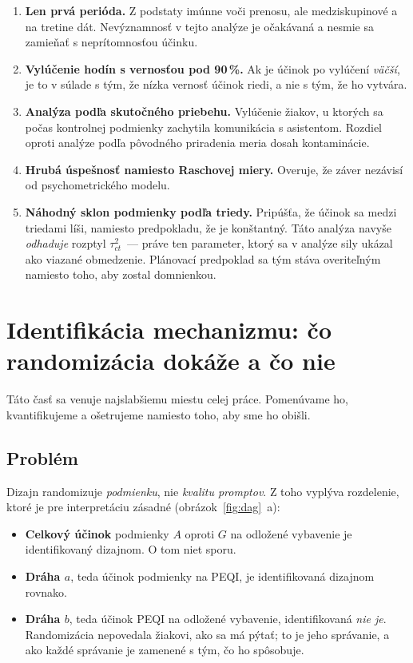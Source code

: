 \begin{enumerate}[nosep]
    \item \textbf{Len prvá perióda.} Z podstaty imúnne voči prenosu, ale medziskupinové a na tretine dát. Nevýznamnosť v tejto analýze je očakávaná a nesmie sa zamieňať s neprítomnosťou účinku.
    \item \textbf{Vylúčenie hodín s vernosťou pod 90\,\%.} Ak je účinok po vylúčení \emph{väčší}, je to v súlade s tým, že nízka vernosť účinok riedi, a nie s tým, že ho vytvára.
    \item \textbf{Analýza podľa skutočného priebehu.} Vylúčenie žiakov, u ktorých sa počas kontrolnej podmienky zachytila komunikácia s asistentom. Rozdiel oproti analýze podľa pôvodného priradenia meria dosah kontaminácie.
    \item \textbf{Hrubá úspešnosť namiesto Raschovej miery.} Overuje, že záver nezávisí od psychometrického modelu.
    \item \textbf{Náhodný sklon podmienky podľa triedy.} Pripúšťa, že účinok sa medzi triedami líši, namiesto predpokladu, že je konštantný. Táto analýza navyše \emph{odhaduje} rozptyl $\tau^2_{ct}$~--- práve ten parameter, ktorý sa v analýze sily ukázal ako viazané obmedzenie. Plánovací predpoklad sa tým stáva overiteľným namiesto toho, aby zostal domnienkou.
\end{enumerate}

\section{Identifikácia mechanizmu: čo randomizácia dokáže a čo nie}
\label{sec:identifikacia}

Táto časť sa venuje najslabšiemu miestu celej práce. Pomenúvame ho, kvantifikujeme a ošetrujeme namiesto toho, aby sme ho obišli.

\subsection{Problém}

Dizajn randomizuje \emph{podmienku}, nie \emph{kvalitu promptov}. Z toho vyplýva rozdelenie, ktoré je pre interpretáciu zásadné (obrázok~\ref{fig:dag}~a):

\begin{itemize}[nosep]
    \item \textbf{Celkový účinok} podmienky $A$ oproti $G$ na odložené vybavenie je identifikovaný dizajnom. O tom niet sporu.
    \item \textbf{Dráha $a$}, teda účinok podmienky na PEQI, je identifikovaná dizajnom rovnako.
    \item \textbf{Dráha $b$}, teda účinok PEQI na odložené vybavenie, identifikovaná \emph{nie je}. Randomizácia nepovedala žiakovi, ako sa má pýtať; to je jeho správanie, a ako každé správanie je zamenené s tým, čo ho spôsobuje.
\end{itemize}

